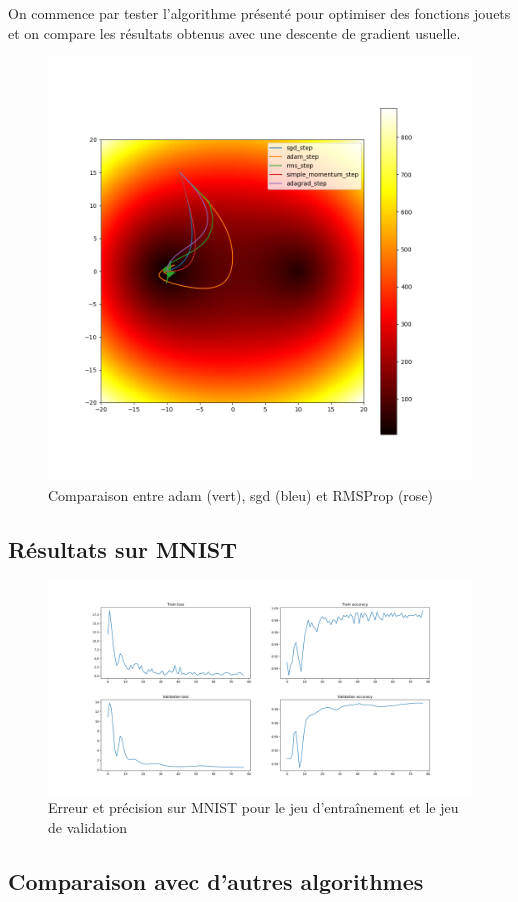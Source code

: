 \documentclass[fleqn,11pt, french, ceqn]{article}
\begin{document}
	On commence par tester l'algorithme présenté pour optimiser des fonctions jouets et on compare les résultats obtenus avec une descente de gradient usuelle.
	
	\begin{figure}[H]
		\centering
		\includegraphics[scale=0.5]{../gdsvm/exports/adam-rms-sgd.png}
		\caption{Comparaison entre adam (vert), sgd (bleu) et RMSProp (rose)}
	\end{figure}
	
	\subsection{Résultats sur MNIST}
	
		\begin{figure}[H]
		\centering
		\includegraphics[scale=0.35]{../gdsvm/exports/adam_train.png}
		\caption{Erreur et précision sur MNIST pour le jeu d'entraînement et le jeu de validation}
	\end{figure}
	
	
	
	
	
	\subsection{Comparaison avec d'autres algorithmes}
	
	

	
	
\end{document}
